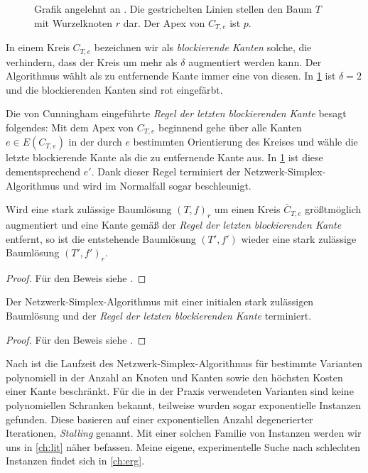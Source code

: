 \begin{figure}[!ht]\centering
    
    \caption{Grafik angelehnt an \cite[S. 372]{GNA}. Die gestrichelten Linien stellen den Baum $T$ mit Wurzelknoten $r$ dar. Der Apex von $C_{T,e}$ ist $p$.}
    \label{fig:rule}
\end{figure}

In einem Kreis $C_{T,e}$ bezeichnen wir als \emph{blockierende Kanten} solche, die verhindern, dass der Kreis um mehr als $\delta$ augmentiert werden kann. Der Algorithmus wählt als zu entfernende Kante immer eine von diesen. In \cref{fig:rule} ist $\delta=2$ und die blockierenden Kanten sind rot eingefärbt.

Die von Cunningham eingeführte \emph{Regel der letzten blockierenden Kante} besagt folgendes: Mit dem Apex von $C_{T,e}$ beginnend gehe über alle Kanten $e\in E(C_{T,e})$ in der durch $e$ bestimmten Orientierung des Kreises und wähle die letzte blockierende Kante als die zu entfernende Kante aus. In \cref{fig:rule} ist diese dementsprechend $e'$. Dank dieser Regel terminiert der Netzwerk-Simplex-Algorithmus und wird im Normalfall sogar beschleunigt. 
 
\begin{lem}
Wird eine stark zulässige Baumlösung $(T,f)_r$ um einen Kreis $\bar{C}_{T,e}$ größtmöglich augmentiert und eine Kante gemäß  der \emph{Regel der letzten blockierenden Kante} entfernt, so ist die entstehende Baumlösung $(T',f')$ wieder eine stark zulässige Baumlösung $(T',f')_r$.\end{lem}
\begin{proof}Für den Beweis siehe \cite[S. 108\,f.]{cycling}. 
\end{proof}

\begin{thm}
Der Netzwerk-Simplex-Algorithmus mit einer initialen stark zulässigen Baumlösung und der \emph{Regel der letzten blockierenden Kante} terminiert.\end{thm}
\begin{proof}Für den Beweis siehe \cite[S. 108\,f.]{cycling}. 
\end{proof}

Nach \cite[S. 359]{GNA} ist die Laufzeit des Netzwerk-Simplex-Algorithmus für bestimmte Varianten polynomiell in der Anzahl an Knoten und Kanten sowie den höchsten Kosten einer Kante beschränkt. Für die in der Praxis verwendeten Varianten sind keine polynomiellen Schranken bekannt, teilweise wurden sogar exponentielle Instanzen gefunden. Diese basieren auf einer exponentiellen Anzahl degenerierter Iterationen, \emph{Stalling} genannt. Mit einer solchen Familie von Instanzen werden wir uns in \cref{ch:lit} näher befassen. Meine eigene, experimentelle Suche nach schlechten Instanzen findet sich in \cref{ch:erg}.

